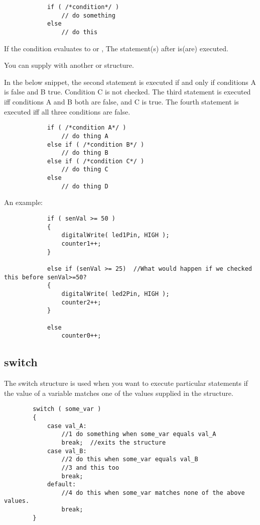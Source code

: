 \documentclass{article}
\begin{document}
			\begin{lstlisting}
			if ( /*condition*/ )
				// do something
			else 
				// do this
			\end{lstlisting}

			If the condition evaluates to  or , The statement(s) after  is(are) executed.

			You can supply  with another  or  structure. 

			In the below snippet, the second statement is executed if and only if conditions A is false and B true. Condition C is not checked. The third statement is executed iff conditions A and B both are false, and C is true. The fourth statement is executed iff all three conditions are false.

			\begin{lstlisting}
			if ( /*condition A*/ )
				// do thing A
			else if ( /*condition B*/ )
				// do thing B
			else if ( /*condition C*/ )
				// do thing C
			else
				// do thing D
			\end{lstlisting}

			An example:

			\begin{lstlisting}
			if ( senVal >= 50 )
			{
				digitalWrite( led1Pin, HIGH );
				counter1++;
			}

			else if (senVal >= 25)	//What would happen if we checked this before senVal>=50?
			{
				digitalWrite( led2Pin, HIGH );
				counter2++;
			}

			else 
				counter0++;

			\end{lstlisting}

	\subsection{switch}

		The switch structure is used when you want to execute particular statements if the value of a variable matches one of the values supplied in the structure.

		\begin{lstlisting}
		switch ( some_var )
		{
			case val_A:
				//1 do something when some_var equals val_A
				break;	//exits the structure
			case val_B:
				//2 do this when some_var equals val_B
				//3 and this too
				break;
			default:
				//4 do this when some_var matches none of the above values.
				break;
		}
		\end{lstlisting}
\end{document}
